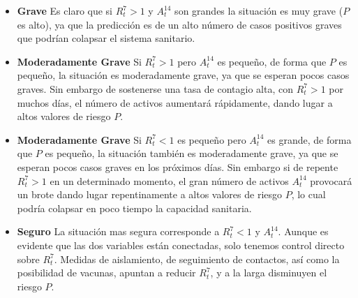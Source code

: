\documentclass[12pt,a4paper]{article}
\begin{document}
\begin{itemize}
\item {\bf Grave} Es claro que si $R^7_t>1$ y $A^{14}_t$ son grandes 
la situación es muy grave ($P$ es alto), ya que la predicción es de un alto número 
de casos positivos graves que podrían colapsar el sistema sanitario.

\item {\bf Moderadamente Grave} Si $R^7_t>1$ pero 
$A^{14}_t$ es pequeño, de forma que $P$ es pequeño, 
la situación es moderadamente grave, ya que se esperan 
pocos casos graves. Sin embargo de sostenerse una tasa de contagio alta, 
con $R^7_t>1$ por muchos días, el n\'umero de
activos aumentará rápidamente, dando lugar a altos valores 
de riesgo $P$. 

\item {\bf Moderadamente Grave} Si $R^7_t<1$ es pequeño pero 
$A^{14}_t$ es grande, de forma que $P$ es pequeño, la situación 
también es moderadamente grave, ya que se esperan 
pocos casos graves en los próximos días. 
Sin embargo si de repente $R^7_t>1$ en un determinado momento, el gran número de activos 
$A^{14}_t$ provocará un brote dando lugar repentinamente 
a altos valores de riesgo $P$, lo cual podría colapsar en poco tiempo 
la capacidad sanitaria.

\item {\bf Seguro}  La situación mas segura corresponde a 
$R^7_t<1$ y $A^{14}_t$. Aunque es evidente que las dos 
variables están conectadas, solo tenemos control 
directo sobre $R^7_t$. Medidas de aislamiento, 
de seguimiento de contactos, así como la posibilidad de vacunas, 
apuntan a reducir $R^7_t$, y a la larga disminuyen el riesgo $P$. 
\end{itemize}
\end{document}
